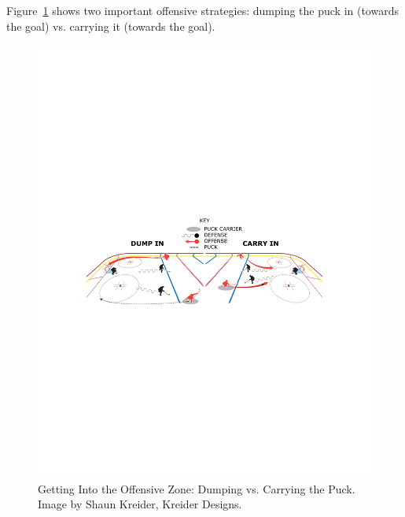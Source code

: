 Figure~\ref{fig:dumpin} shows two important offensive strategies: dumping the puck in (towards the goal) vs. carrying it (towards the goal).  

\begin{figure}
\centering 
\includegraphics[width=1\textwidth]
{dumpvscarry}
\caption{Getting Into the Offensive Zone: Dumping vs. Carrying the Puck. Image by Shaun Kreider, Kreider Designs.}
\label{fig:dumpin}
\end{figure}


